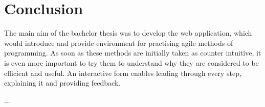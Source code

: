 \chapter*{Conclusion}  %

The main aim of the bachelor thesis was to develop the web application, which would introduce and provide environment for practising agile methods of programming. As soon as these methods are initially taken as counter intuitive, it is even more important to try them to understand why they are considered to be efficient and useful. An interactive form enables leading through every step, explaining it and providing feedback.

...
